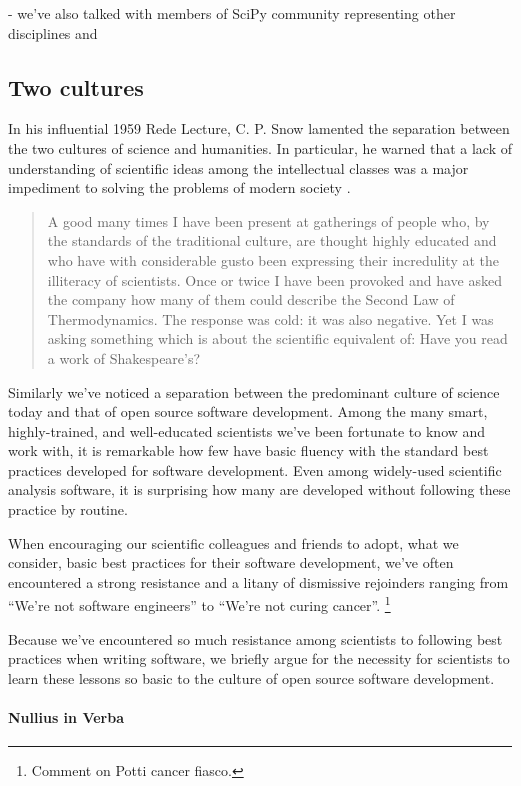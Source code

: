 \documentclass[ChapterTOCs,krantz2]{krantz} %
\begin{document}
- we've also talked with members of SciPy community representing
other disciplines and 


\subsection{Two cultures}

In his influential 1959 Rede Lecture, C. P. Snow lamented the separation between the
two cultures of science and humanities.  In particular, he warned that a lack
of understanding of scientific ideas among the intellectual classes was a major
impediment to solving the problems of modern society \cite{snow1960two}.

\begin{quote}
A good many times I have been present at gatherings of people who, by the
standards of the traditional culture, are thought highly educated and who have
with considerable gusto been expressing their incredulity at the illiteracy of
scientists. Once or twice I have been provoked and have asked the company how
many of them could describe the Second Law of Thermodynamics. The response was
cold: it was also negative. Yet I was asking something which is about the
scientific equivalent of: Have you read a work of Shakespeare’s?
\end{quote}

Similarly we've noticed a separation between the predominant culture of
science today and that of open source software development. Among the
many smart, highly-trained, and well-educated scientists we've been
fortunate to know and work with, it is remarkable how few have basic
fluency with the standard best practices developed for software development.
Even among widely-used scientific analysis software, it is surprising how
many are developed without following these practice by routine.

When encouraging our scientific colleagues and friends to adopt, what we
consider, basic best practices for their software development, we've often
encountered a strong resistance and a litany of dismissive rejoinders ranging
from ``We're not software engineers'' to ``We're not curing cancer''.%
\footnote{Comment on Potti cancer fiasco.}

Because we've encountered so much resistance among scientists to following best
practices when writing software, we briefly argue for the necessity for
scientists to learn these lessons so basic to the culture of open source
software development.

\paragraph{ {\bf Nullius in Verba}} 
\end{document}
